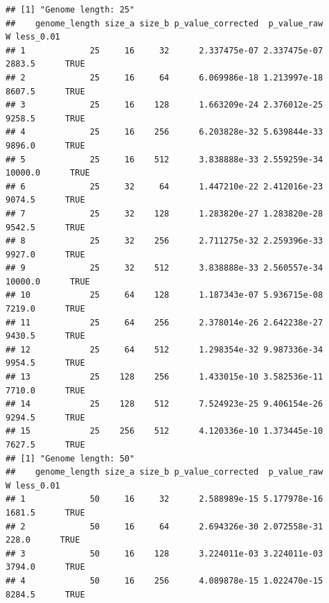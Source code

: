 \documentclass[]{book}
\newenvironment{Shaded}{\begin{snugshade}}{\end{snugshade}}
\newcommand{\DataTypeTok}[1]{\textcolor[rgb]{0.13,0.29,0.53}{#1}}
\newcommand{\FloatTok}[1]{\textcolor[rgb]{0.00,0.00,0.81}{#1}}
\newcommand{\KeywordTok}[1]{\textcolor[rgb]{0.13,0.29,0.53}{\textbf{#1}}}
\newcommand{\NormalTok}[1]{#1}
\newcommand{\OperatorTok}[1]{\textcolor[rgb]{0.81,0.36,0.00}{\textbf{#1}}}
\newcommand{\StringTok}[1]{\textcolor[rgb]{0.31,0.60,0.02}{#1}}
\begin{document}
\begin{Shaded}
\end{Shaded}

\begin{verbatim}
## [1] "Genome length: 25"
##    genome_length size_a size_b p_value_corrected  p_value_raw       W less_0.01
## 1             25     16     32      2.337475e-07 2.337475e-07  2883.5      TRUE
## 2             25     16     64      6.069986e-18 1.213997e-18  8607.5      TRUE
## 3             25     16    128      1.663209e-24 2.376012e-25  9258.5      TRUE
## 4             25     16    256      6.203828e-32 5.639844e-33  9896.0      TRUE
## 5             25     16    512      3.838888e-33 2.559259e-34 10000.0      TRUE
## 6             25     32     64      1.447210e-22 2.412016e-23  9074.5      TRUE
## 7             25     32    128      1.283820e-27 1.283820e-28  9542.5      TRUE
## 8             25     32    256      2.711275e-32 2.259396e-33  9927.0      TRUE
## 9             25     32    512      3.838888e-33 2.560557e-34 10000.0      TRUE
## 10            25     64    128      1.187343e-07 5.936715e-08  7219.0      TRUE
## 11            25     64    256      2.378014e-26 2.642238e-27  9430.5      TRUE
## 12            25     64    512      1.298354e-32 9.987336e-34  9954.5      TRUE
## 13            25    128    256      1.433015e-10 3.582536e-11  7710.0      TRUE
## 14            25    128    512      7.524923e-25 9.406154e-26  9294.5      TRUE
## 15            25    256    512      4.120336e-10 1.373445e-10  7627.5      TRUE
## [1] "Genome length: 50"
##    genome_length size_a size_b p_value_corrected  p_value_raw      W less_0.01
## 1             50     16     32      2.588989e-15 5.177978e-16 1681.5      TRUE
## 2             50     16     64      2.694326e-30 2.072558e-31  228.0      TRUE
## 3             50     16    128      3.224011e-03 3.224011e-03 3794.0      TRUE
## 4             50     16    256      4.089878e-15 1.022470e-15 8284.5      TRUE

\end{verbatim}
\end{document}
